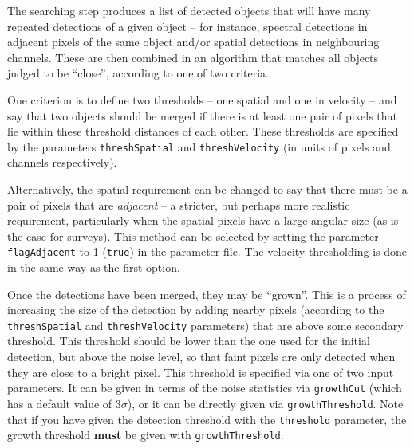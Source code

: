 %

\label{sec-merger}

The searching step produces a list of detected objects that will have
many repeated detections of a given object -- for instance, spectral
detections in adjacent pixels of the same object and/or spatial
detections in neighbouring channels. These are then combined in an
algorithm that matches all objects judged to be ``close'', according
to one of two criteria.

One criterion is to define two thresholds -- one spatial and one in
velocity -- and say that two objects should be merged if there is at
least one pair of pixels that lie within these threshold distances of
each other. These thresholds are specified by the parameters
\texttt{threshSpatial} and \texttt{threshVelocity} (in units of pixels
and channels respectively).

Alternatively, the spatial requirement can be changed to say that
there must be a pair of pixels that are \emph{adjacent} -- a stricter,
but perhaps more realistic requirement, particularly when the spatial
pixels have a large angular size (as is the case for 
\hi surveys). This 
method can be selected by setting the parameter
\texttt{flagAdjacent} to 1 (\ie \texttt{true}) in the parameter
file. The velocity thresholding is done in the same way as the first
option.

Once the detections have been merged, they may be ``grown''. This is a
process of increasing the size of the detection by adding nearby
pixels (according to the \texttt{threshSpatial} and
\texttt{threshVelocity} parameters) that are above some secondary
threshold. This threshold should be lower than the one used for the
initial detection, but above the noise level, so that faint pixels are
only detected when they are close to a bright pixel. This
threshold is specified via one of two input parameters. It can be
given in terms of the noise statistics via \texttt{growthCut} (which
has a default value of $3\sigma$), or it can be directly given via
\texttt{growthThreshold}. Note that if you have given the detection
threshold with the \texttt{threshold} parameter, the growth threshold
\textbf{must} be given with \texttt{growthThreshold}.

